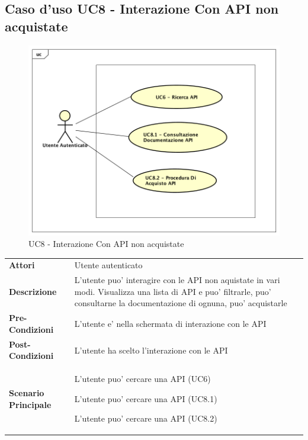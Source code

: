 \newpage
\subsection{Caso d'uso UC8 - Interazione Con API non acquistate}
\label{UC8}
\begin{figure}[ht]
	\centering
	\includegraphics[scale=0.45]{UML/UC8.png}
	\caption{UC8 - Interazione Con API non acquistate}
\end{figure}

\begin{longtable}{ l | p{11cm}}
	\hline
	\rowcolor{Gray}
	\multicolumn{2}{c}{UC8 - Interazione Con API non acquistate}\\
	\hline
	
	 \textbf{Attori} & Utente autenticato  \\
	\textbf{Descrizione} & L'utente puo' interagire con le API non aquistate in vari modi. Visualizza una lista di API e puo' filtrarle, puo' consultarne la documentazione di ognuna, puo' acquistarle \\
	\textbf{Pre-Condizioni} & L'utente e' nella schermata di interazione con le API\\
	\textbf{Post-Condizioni} & L'utente ha scelto l'interazione con le API\\
	\textbf{Scenario Principale} & 
	\begin{enumerate*}[label=(\arabic*.),itemjoin={\newline}]
		\item L'utente puo' cercare una API (UC6)
		\item L'utente puo' cercare una API (UC8.1)
		\item L'utente puo' cercare una API (UC8.2)
	\end{enumerate*}\\
\end{longtable}

